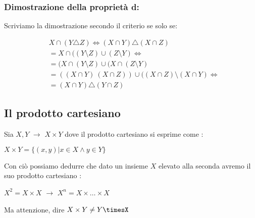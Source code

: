 \documentclass[article,12pt]{book}
\begin{document}
\begin{enumerate}
\subsubsection{Dimostrazione della proprietà d:}
Scriviamo la dimostrazione secondo il criterio se solo se:
\begin{center}
    \begin{align*}
        & X \cap (Y \triangle Z) \iff (X \cap Y) \triangle (X \cap Z)  \\
        &= X \cap ((Y \setminus Z) \cup (Z \setminus Y) \iff \\
        &= (X \cap (Y \setminus Z) \cup (X \cap (Z \setminus Y) \\
        &= ((X \cap Y) \ (X \cap Z)) \cup ((X \cap Z) \setminus (X \cap Y) \iff \\
        &= (X \cap Y) \triangle(Y \cap Z)
    \end{align*}
\end{center}

\newpage
\subsection{Il prodotto cartesiano}
\label{prodotto cartesiano}
Sia $X,Y$ $\rightarrow$ $X \times Y$ dove il prodotto cartesiano si esprime come :
    \begin{center}
        $X \times Y = \{(x,y)| x \in X \land y \in Y \}$
    \end{center}
Con ciò possiamo dedurre che dato un insieme $X$ elevato alla seconda avremo il suo prodotto cartesiano :
\begin{center}
    $X^2 = X \times X$ $\rightarrow$ $X^n = X \times \dots \times X$
\end{center}

Ma attenzione, dire $X \times Y \neq Y \timesX$

\begin{center}
\end{center}
\end{enumerate}
\end{document}
